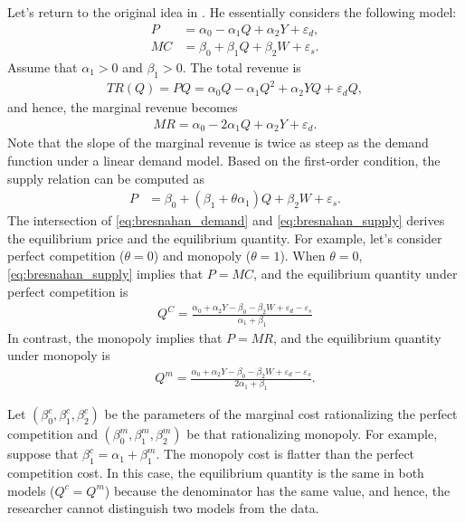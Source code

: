 \documentclass[11pt, a4paper]{article}
\theoremstyle{remark}
\begin{document}
Let's return to the original idea in \citet{bresnahan1982oligopoly}.
He essentially considers the following model:
\begin{align}
    P & = \alpha_0 - \alpha_1 Q + \alpha_2 Y + \varepsilon_d,\label{eq:bresnahan_demand} \\
    MC & = \beta_0 + \beta_1 Q + \beta_2 W + \varepsilon_s. \label{eq:bresnahan_marginal_cost}
\end{align}
Assume that $\alpha_1>0$ and $\beta_1 >0$.
The total revenue is 
\begin{align}
    TR(Q) = PQ = \alpha_0Q - \alpha_1 Q^2 + \alpha_2 YQ + \varepsilon_d Q,
\end{align}
and hence, the marginal revenue becomes
\begin{align}
    MR = \alpha_0 - 2\alpha_1 Q + \alpha_2 Y + \varepsilon_d. \label{eq:bresnahan_marginal_revenue}
\end{align}
Note that the slope of the marginal revenue is twice as steep as the demand function under a linear demand model.
Based on the first-order condition, the supply relation can be computed as
\begin{align}
    P & = \beta_0 + (\beta_1 + \theta\alpha_1) Q  + \beta_2 W + \varepsilon_s.\label{eq:bresnahan_supply}
\end{align}
The intersection of \eqref{eq:bresnahan_demand} and \eqref{eq:bresnahan_supply} derives the equilibrium price and the equilibrium quantity.
For example, let's consider perfect competition ($\theta = 0$) and monopoly ($\theta = 1$).
When $\theta = 0$, \eqref{eq:bresnahan_supply} implies that $P = MC$, and the equilibrium quantity under perfect competition is
\begin{align}
    Q^C = \frac{\alpha_0 + \alpha_2 Y - \beta_0 - \beta_2 W+ \varepsilon_d - \varepsilon_s}{\alpha_1 + \beta_1}
\end{align}
In contrast, the monopoly implies that $P = MR$, and the equilibrium quantity under monopoly is
\begin{align}
    Q^m = \frac{\alpha_0 + \alpha_2 Y - \beta_0 - \beta_2 W+ \varepsilon_d - \varepsilon_s}{2\alpha_1 + \beta_1}.
\end{align}

Let $(\beta_0^c, \beta_1^c, \beta_2^c)$ be the parameters of the marginal cost rationalizing the perfect competition and $(\beta_0^m, \beta_1^m, \beta_2^m)$ be that rationalizing monopoly. 
For example, suppose that $\beta_1^c = \alpha_1 + \beta_1^m$.
The monopoly cost is flatter than the perfect competition cost.
In this case, the equilibrium quantity is the same in both models ($Q^c = Q^m$) because the denominator has the same value, and hence, the researcher cannot distinguish two models from the data.
\end{document}
